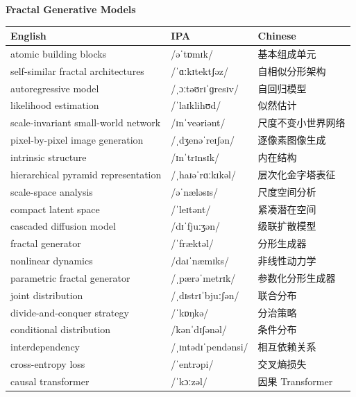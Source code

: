 \documentclass[UTF8,12pt,a4paper]{ctexart}
\providecommand{\zh}[1]{#1}
\begin{document}
\begin{center}
    {\Large\bfseries Fractal Generative Models}
\end{center}

\begin{tabular*}{\textwidth}{@{\extracolsep{\fill}}lll@{}}
\toprule
\textbf{English} & \textbf{IPA} & \textbf{Chinese} \\
\midrule
atomic building blocks & {\ipafont /əˈtɒmɪk/} & \zh{基本组成单元} \\
self-similar fractal architectures & {\ipafont /ˈɑːkɪtektʃəz/} & \zh{自相似分形架构} \\
autoregressive model & {\ipafont /ˌɔːtəʊrɪˈɡresɪv/} & \zh{自回归模型} \\
likelihood estimation & {\ipafont /ˈlaɪklihʊd/} & \zh{似然估计} \\
scale-invariant small-world network & {\ipafont /ɪnˈveəriənt/} & \zh{尺度不变小世界网络} \\
pixel-by-pixel image generation & {\ipafont /ˌdʒenəˈreɪʃən/} & \zh{逐像素图像生成} \\
intrinsic structure & {\ipafont /ɪnˈtrɪnsɪk/} & \zh{内在结构} \\
hierarchical pyramid representation & {\ipafont /ˌhaɪəˈrɑːkɪkəl/} & \zh{层次化金字塔表征} \\
scale-space analysis & {\ipafont /əˈnæləsɪs/} & \zh{尺度空间分析} \\
compact latent space & {\ipafont /ˈleɪtənt/} & \zh{紧凑潜在空间} \\
cascaded diffusion model & {\ipafont /dɪˈfjuːʒən/} & \zh{级联扩散模型} \\
fractal generator & {\ipafont /ˈfræktəl/} & \zh{分形生成器} \\
nonlinear dynamics & {\ipafont /daɪˈnæmɪks/} & \zh{非线性动力学} \\
parametric fractal generator & {\ipafont /ˌpærəˈmetrɪk/} & \zh{参数化分形生成器} \\
joint distribution & {\ipafont /ˌdɪstrɪˈbjuːʃən/} & \zh{联合分布} \\
divide-and-conquer strategy & {\ipafont /ˈkɒŋkə/} & \zh{分治策略} \\
conditional distribution & {\ipafont /kənˈdɪʃənəl/} & \zh{条件分布} \\
interdependency & {\ipafont /ˌɪntədɪˈpendənsi/} & \zh{相互依赖关系} \\
cross-entropy loss & {\ipafont /ˈentrəpi/} & \zh{交叉熵损失} \\
causal transformer & {\ipafont /ˈkɔːzəl/} & \zh{因果 Transformer} \\

\end{tabular*}
\end{document}
